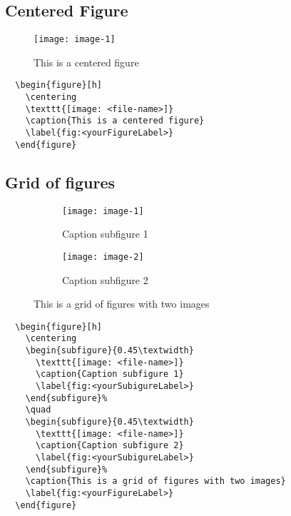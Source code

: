 \clearpage
\subsection{Centered Figure}

\begin{figure}[h]
  \centering
  \texttt{[image: image-1]}
  \caption{This is a centered figure}
  \label{fig:image1}
\end{figure}

\begin{lstlisting}
  \begin{figure}[h]
    \centering
    \texttt{[image: <file-name>]}
    \caption{This is a centered figure}
    \label{fig:<yourFigureLabel>}
  \end{figure}
\end{lstlisting}

\clearpage
\subsection{Grid of figures}

\begin{figure}[h]
  \centering
  \begin{subfigure}{0.45\textwidth}
    \texttt{[image: image-1]} 
    \caption{Caption subfigure 1}
    \label{fig:subim1}
  \end{subfigure}%
  \quad
  \begin{subfigure}{0.45\textwidth}
    \texttt{[image: image-2]}
    \caption{Caption subfigure 2}
    \label{fig:subim2}
  \end{subfigure}%
  \caption{This is a grid of figures with two images}
  \label{fig:image2}
\end{figure}

\begin{lstlisting}
  \begin{figure}[h]
    \centering
    \begin{subfigure}{0.45\textwidth}
      \texttt{[image: <file-name>]} 
      \caption{Caption subfigure 1}
      \label{fig:<yourSubigureLabel>}
    \end{subfigure}%
    \quad
    \begin{subfigure}{0.45\textwidth}
      \texttt{[image: <file-name>]}
      \caption{Caption subfigure 2}
      \label{fig:<yourSubigureLabel>}
    \end{subfigure}%
    \caption{This is a grid of figures with two images}
    \label{fig:<yourFigureLabel>}
  \end{figure}
\end{lstlisting}